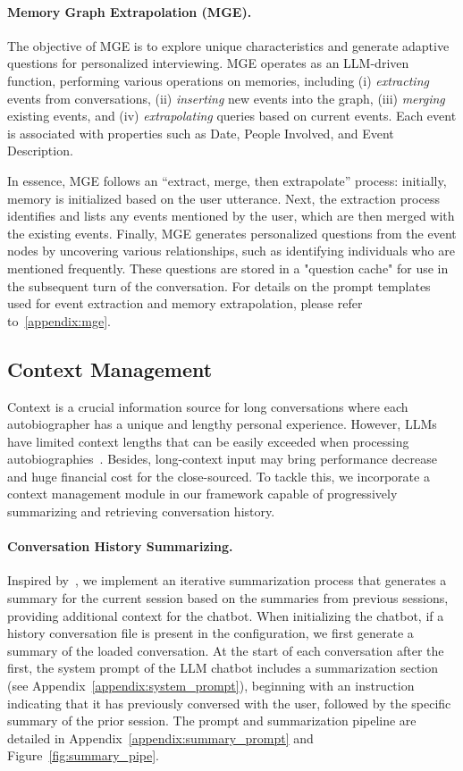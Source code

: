 \paragraph{Memory Graph Extrapolation (MGE).}\label{sec:memory_graph}
The objective of MGE is to explore unique characteristics and generate adaptive questions for personalized interviewing. MGE operates as an LLM-driven function, performing various operations on memories, including (i) \textit{extracting} events from conversations, (ii) \textit{inserting} new events into the graph, (iii) \textit{merging} existing events, and (iv) \textit{extrapolating} queries based on current events. Each event is associated with properties such as Date, People Involved, and Event Description.

In essence, MGE follows an ``extract, merge, then extrapolate'' process: initially, memory is initialized based on the user utterance. Next, the extraction process identifies and lists any events mentioned by the user, which are then merged with the existing events. Finally, MGE generates personalized questions from the event nodes by uncovering various relationships, such as identifying individuals who are mentioned frequently. These questions are stored in a "question cache" for use in the subsequent turn of the conversation. For details on the prompt templates used for event extraction and memory extrapolation, please refer to~\cref{appendix:mge}.


\subsection{Context Management}
Context is a crucial information source for long conversations where each autobiographer has a unique and lengthy personal experience.
However, LLMs have limited context lengths that can be easily exceeded when processing autobiographies~\cite{dai2019transformer}. Besides, long-context input may bring performance decrease~\cite{Liu2023LostIT} and huge financial cost for the close-sourced. To tackle this, we incorporate a context management module in our framework capable of progressively summarizing and retrieving conversation history.

\paragraph{Conversation History Summarizing.}
Inspired by~\citeauthor{Chang2023BooookScoreAS,maharana2024lococmo}, we implement an iterative summarization process that generates a summary for the current session based on the summaries from previous sessions, providing additional context for the chatbot. When initializing the chatbot, if a history conversation file is present in the configuration, we first generate a summary of the loaded conversation. At the start of each conversation after the first, the system prompt of the LLM chatbot includes a summarization section (see Appendix~\ref{appendix:system_prompt}), beginning with an instruction indicating that it has previously conversed with the user, followed by the specific summary of the prior session. The prompt and summarization pipeline are detailed in Appendix~\ref{appendix:summary_prompt} and Figure~\ref{fig:summary_pipe}.

